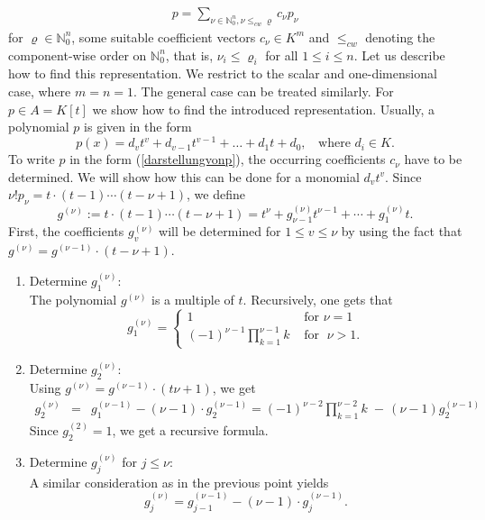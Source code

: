 \documentclass[a4paper,10pt]{article}
\theoremstyle{nonumberplain}
\newcommand{\N}{\mathbb{N}}
\begin{document}
\begin{eqnarray}
p = \sum_{\nu \in \N_0^n, \nu \leq_{cw} \varrho} c_{\nu} p_{\nu} \label{darstellungvonp} 
\end{eqnarray}
for $\varrho \in \N_0^n$, some suitable 
coefficient vectors $c_{\nu} \in K^m$ and 
$\leq_{cw}$ denoting the component-wise order on ${\N}_0^n$, 
that is, $\nu_i \leq \varrho_i$ 
for all $1 \leq i \leq n$. 
Let us describe how to find this representation. We restrict to the 
scalar and one-dimensional case, 
where $m=n=1$. The general case can be treated similarly. 
For $p \in A=K[t]$ we show how to find the introduced 
representation. Usually, a 
polynomial $p$ is given in the form 
$$p(x)=d_v t^v + d_{v-1} t^{v-1} + \dots + d_{1}t + d_0, \;\; \mbox{ where } d_i \in K.$$
To write $p$ in the form (\ref{darstellungvonp}), 
the occurring coefficients $c_{\nu}$ 
have to be determined. We will show how this can be done for a 
monomial $d_v t^v$. Since $\nu! p_{\nu} = t \cdot (t-1) \cdots (t-\nu+1)$, 
we define 
$$ g^{(\nu)}:=
t\cdot (t-1) \cdots (t-\nu+1) = t^{\nu} + g_{\nu-1}^{(\nu)} t^{\nu-1} + \cdots + g_1^{(\nu)}t.$$
First, the coefficients $g_{v}^{(\nu)}$ will be determined for $1 \leq v \leq \nu$ by 
using the fact that $g^{(\nu)}=g^{(\nu-1)} \cdot (t - \nu +1 )$.
\begin{enumerate} 
\item Determine $g_1^{(\nu)}$:\\
The polynomial $g^{(\nu)}$ is a multiple of $t$.
Recursively, one gets that 
$$g_1^{(\nu)} = 
\left\lbrace  \begin{array}{cc}
1 & \mbox{ for } \nu = 1\\
(-1)^{\nu - 1}  \prod_{k=1}^{\nu-1} k & \mbox{ for } \; \nu > 1. 
\end{array} \right.
$$  
\item Determine $g_2^{(\nu)}$:\\
Using $g^{(\nu)}= g^{(\nu-1)} \cdot (t\nu+1)$, we get
\begin{eqnarray*}
g_2^{(\nu)}& =& g_1^{(\nu-1)} - (\nu-1) \cdot g_2^{(\nu-1)} 
= (-1)^{\nu - 2} \prod_{k=1}^{\nu-2} k     \; - \, (\nu-1) g_2^{(\nu-1)}
\end{eqnarray*}
Since $g_2^{(2)}=1$, we get a recursive formula.
\item Determine $g_j^{(\nu)}$ for $j \leq \nu$:\\
A similar consideration as in the previous point yields
$$ g_j^{(\nu)}=g_{j-1}^{(\nu-1)} - (\nu-1) \cdot g_j^{(\nu-1)}.$$
\end{enumerate}
\end{document}
